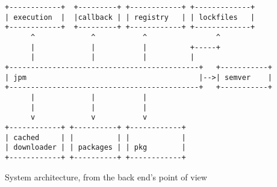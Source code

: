 \begin{listing}[H]
\begin{verbatim}
+------------+  +---------+ +------------+ +-------------+
| execution  |  |callback | | registry   | | lockfiles   |
+------------+  +---------+ +------------+ +-------------+
      ^             ^           ^                ^
      |             |           |          +-----+
      |             |           |          |
+--------------------------------------------+   +-----------+
| jpm                                        |-->| semver    |
+--------------------------------------------+   +-----------+
      |             |           |
      |             |           |
      v             v           v
+------------+ +----------+ +------------+
| cached     | |          | |            |
| downloader | | packages | | pkg        |
+------------+ +----------+ +------------+
\end{verbatim}
\caption{System architecture, from the back end's point of view}
\label{fig:jpm_arch}
\end{listing}

